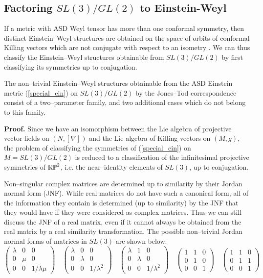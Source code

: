 \subsection{Factoring $SL(3)/GL(2)$ to Einstein-Weyl}
\label{neat2}
If a metric with ASD Weyl tensor has more than one conformal symmetry, then distinct Einstein--Weyl structures are obtained on the space of orbits of conformal Killing vectors which are not conjugate with respect to an isometry \cite{PT}. We can thus classify the Einstein--Weyl structures obtainable from $SL(3)/GL(2)$ by first classifying its symmetries up to conjugation.
\begin{prop}
The non--trivial Einstein--Weyl structures obtainable from the ASD Einstein metric (\ref{special_ein}) on $SL(3)/GL(2)$ by the Jones--Tod correspondence consist of a two--parameter family, and two additional cases which do not belong to this family.
\end{prop}
\noindent
{\bf Proof. }Since we have an isomorphism between the Lie algebra of projective vector fields on $(N,[\nabla])$ and the Lie algebra of Killing vectors on $(M,g)$, the problem of classifying the symmetries of (\ref{special_ein}) on $M=SL(3)/GL(2)$ is reduced to a classification of the infinitesimal  projective symmetries of $\mathbb{RP}^2$, i.e. the near--identity elements of $SL(3)$, up to conjugation.

Non--singular complex matrices are determined up to similarity by their Jordan normal form (JNF). While real matrices do not have such a canonical form, all of the information they contain is determined (up to similarity) by the JNF that they would have if they were considered as complex matrices. Thus we can still discuss the JNF of a real matrix, even if it cannot always be obtained from the real matrix by a real similarity transformation. The possible non--trivial Jordan normal forms of matrices in $SL(3)$ are shown below.
\[
\begin{pmatrix}\lambda & 0 & 0\\
0 & \mu & 0\\
0 & 0 & 1/\lambda\mu
\end{pmatrix}
\quad
\begin{pmatrix}\lambda & 0 & 0\\
0 & \lambda & 0\\
0 & 0 & 1/\lambda^2
\end{pmatrix}
\quad
\begin{pmatrix}\lambda & 1 & 0\\
0 & \lambda & 0\\
0 & 0 & 1/\lambda^2
\end{pmatrix}
\quad
\begin{pmatrix}1 & 1 & 0\\
0 & 1 & 0\\
0 & 0 & 1
\end{pmatrix}
\quad
\begin{pmatrix}1 & 1 & 0\\
0 & 1 & 1\\
0 & 0 & 1
\end{pmatrix}
\]

